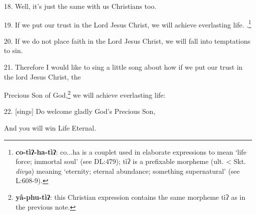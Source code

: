 18. Well, it's just the same with us Christians too.

19. If we put our trust in the Lord Jesus Christ, we will achieve everlasting life.
.\footnote{\textbf{co-tìʔ-ha-tìʔ}: co...ha is a couplet used in elaborate expressions to mean `life force; immortal soul' (see DL:479); tìʔ is a prefixable morpheme (ult. < Skt. \textit{divya}) meaning `eternity; eternal abundance; something supernatural' (see L:608-9).}

20. If we do not place faith in the Lord Jesus Christ, we will fall into temptations
to sin.

21. Therefore I would like to sing a little song about how if we put our trust
in the lord Jesus Christ, the

Precious Son of God,\footnote{\textbf{yâ-phu-tìʔ}: this Christian expression contains the same morpheme tìʔ as in the previous note.} we will achieve everlasting life:

22. [sings] Do welcome gladly God's Precious Son,

And you will win Life Eternal.

